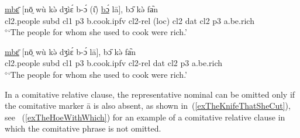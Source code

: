 \documentclass[10pt,twoside]{article}
\def\ci#1{{\ipaFont #1}}
\newcommand{\gl}[1]{`#1'}
\def\VSP{\vspace{0pt}}
\newcommand{\cl}[1]{{\sc cl#1}}
\newcommand{\pref}[1]{(\ref{#1})}
\def\elicited{$^\diamond$}
\def\ih{ɩ}
\begin{document}
\begin{exe}
\ex     \label{DativeWithAndWithoutResPro}
\begin{xlist}

	\ex \label{exThePeopleForWhomWithPro}	
		\gll \uline{mbɛ̄} [nō̤ wù kə̀ dʒìɛ́ b-ɔ́ ({\H\ih}) \uline{bɔ́} lā], bɔ̋ kə̀ fa᷆n	\\
		\cl2.people {\sc subd} \cl1  {\sc p3} b.cook.{\sc ipfv} \cl2-{\sc rel} ({\sc loc}) \cl2  {\sc dat} \cl2  {\sc p3} a.be.rich	\\
		\glt \VSP \elicited \gl{The people for whom she used to cook were rich.}

	\ex \label{exThePeopleForWhomOnlyPP}
		\gll \uline{mbɛ̄} [nō̤ wù kə̀ dʒìɛ́ b-ɔ́ lā], bɔ̋ kə̀ fa᷆n	\\
		\cl2.people {\sc subd} \cl1  {\sc p3} b.cook.{\sc ipfv} \cl2-{\sc rel} {\sc dat} \cl2  {\sc p3} a.be.rich	\\
		\glt \VSP \elicited \gl{The people for whom she used to cook were rich.}

\end{xlist}
\end{exe}

In a comitative relative clause, the representative nominal can be omitted only if the comitative marker \ci{ā} 
is also absent, as shown in~\pref{exTheKnifeThatSheCut}, see ~\pref{exTheHoeWithWhich} for an example of a comitative relative clause in which the comitative phrase is not omitted.

\end{document}

